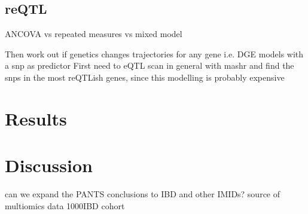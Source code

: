 \begin{outline}
\subsection{reQTL}



ANCOVA vs repeated measures vs mixed model


Then work out if genetics changes trajectories for any gene i.e. DGE models with a snp as predictor
First need to eQTL scan in general with mashr and find the snps in the most reQTLish genes, since this modelling is probably expensive

\section{Results}

\section{Discussion}


%

\1 can we expand the PANTS conclusions to IBD and other IMIDs?
\1 source of multiomics data 1000IBD cohort \autocite{imhann20191000IBDProjectMultiomics}

\end{outline}
